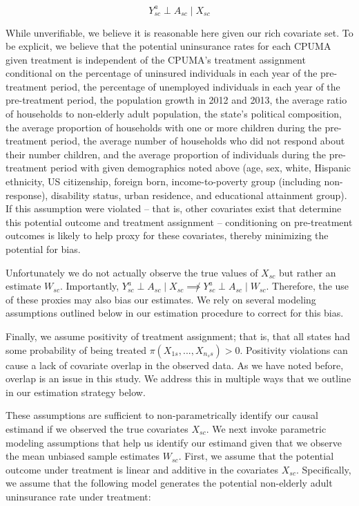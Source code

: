\documentclass[12pt]{article}
\begin{document}
$$
Y_{sc}^a \perp A_{sc} \mid X_{sc}
$$

While unverifiable, we believe it is reasonable here given our rich covariate set. To be explicit, we believe that the potential uninsurance rates for each CPUMA given treatment is independent of the CPUMA's treatment assignment conditional on the percentage of uninsured individuals in each year of the pre-treatment period, the percentage of unemployed individuals in each year of the pre-treatment period, the population growth in 2012 and 2013, the average ratio of households to non-elderly adult population, the state's political composition, the average proportion of households with one or more children during the pre-treatment period, the average number of households who did not respond about their number children, and the average proportion of individuals during the pre-treatment period with given demographics noted above (age, sex, white, Hispanic ethnicity, US citizenship, foreign born, income-to-poverty group (including non-response), disability status, urban residence, and educational attainment group). If this assumption were violated -- that is, other covariates exist that determine this potential outcome and treatment assignment -- conditioning on pre-treatment outcomes is likely to help proxy for these covariates, thereby minimizing the potential for bias. 

Unfortunately we do not actually observe the true values of $X_{sc}$ but rather an estimate $W_{sc}$. Importantly, $Y_{sc}^a \perp A_{sc} \mid X_{sc} \not\implies Y_{sc}^a \perp A_{sc} \mid W_{sc}$. Therefore, the use of these proxies may also bias our estimates. We rely on several modeling assumptions outlined below in our estimation procedure to correct for this bias.

Finally, we assume positivity of treatment assignment; that is, that all states had some probability of being treated $\pi(X_{1s}, ..., X_{n_ss}) > 0$. Positivity violations can cause a lack of covariate overlap in the observed data. As we have noted before, overlap is an issue in this study. We address this in multiple ways that we outline in our estimation strategy below. 

These assumptions are sufficient to non-parametrically identify our causal estimand if we observed the true covariates $X_{sc}$. We next invoke parametric modeling assumptions that help us identify our estimand given that we observe the mean unbiased sample estimates $W_{sc}$. First, we assume that the potential outcome under treatment is linear and additive in the covariates $X_{sc}$. Specifically, we assume that the following model generates the potential non-elderly adult uninsurance rate under treatment:
\end{document}
